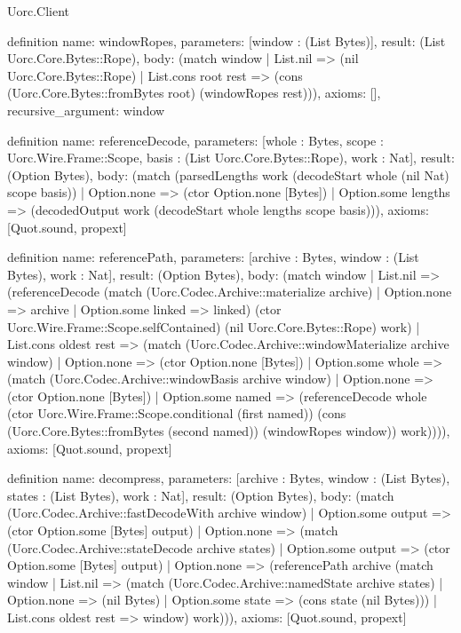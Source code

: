 \begin{lexlean}{Uorc.Client}
\begin{semanticmodule}
definition{
  name: windowRopes,
  parameters: [window : (List Bytes)],
  result: (List Uorc.Core.Bytes::Rope),
  body: (match window
    | List.nil => (nil Uorc.Core.Bytes::Rope)
    | List.cons root rest => (cons (Uorc.Core.Bytes::fromBytes root) (windowRopes rest))),
  axioms: [],
  recursive_argument: window
}

definition{
  name: referenceDecode,
  parameters: [whole : Bytes, scope : Uorc.Wire.Frame::Scope, basis : (List Uorc.Core.Bytes::Rope), work : Nat],
  result: (Option Bytes),
  body: (match (parsedLengths work (decodeStart whole (nil Nat) scope basis))
    | Option.none => (ctor Option.none [Bytes])
    | Option.some lengths => (decodedOutput work (decodeStart whole lengths scope basis))),
  axioms: [Quot.sound, propext]
}

definition{
  name: referencePath,
  parameters: [archive : Bytes, window : (List Bytes), work : Nat],
  result: (Option Bytes),
  body: (match window
    | List.nil => (referenceDecode (match (Uorc.Codec.Archive::materialize archive)
      | Option.none => archive
      | Option.some linked => linked) (ctor Uorc.Wire.Frame::Scope.selfContained) (nil Uorc.Core.Bytes::Rope) work)
    | List.cons oldest rest => (match (Uorc.Codec.Archive::windowMaterialize archive window)
      | Option.none => (ctor Option.none [Bytes])
      | Option.some whole => (match (Uorc.Codec.Archive::windowBasis archive window)
        | Option.none => (ctor Option.none [Bytes])
        | Option.some named => (referenceDecode whole (ctor Uorc.Wire.Frame::Scope.conditional (first named)) (cons (Uorc.Core.Bytes::fromBytes (second named)) (windowRopes window)) work)))),
  axioms: [Quot.sound, propext]
}

definition{
  name: decompress,
  parameters: [archive : Bytes, window : (List Bytes), states : (List Bytes), work : Nat],
  result: (Option Bytes),
  body: (match (Uorc.Codec.Archive::fastDecodeWith archive window)
    | Option.some output => (ctor Option.some [Bytes] output)
    | Option.none => (match (Uorc.Codec.Archive::stateDecode archive states)
      | Option.some output => (ctor Option.some [Bytes] output)
      | Option.none => (referencePath archive (match window
        | List.nil => (match (Uorc.Codec.Archive::namedState archive states)
          | Option.none => (nil Bytes)
          | Option.some state => (cons state (nil Bytes)))
        | List.cons oldest rest => window) work))),
  axioms: [Quot.sound, propext]
}
\end{semanticmodule}
\end{lexlean}
